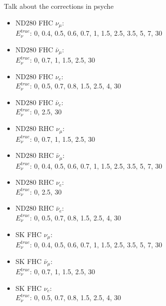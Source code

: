 Talk about the corrections in psyche
\begin{itemize}
  \item ND280 FHC $\nu_\mu$:\\
    $E_\nu^{true}$: 0, 0.4, 0.5, 0.6, 0.7, 1, 1.5, 2.5, 3.5, 5, 7, 30 \\

  \item ND280 FHC $\bar{\nu}_\mu$:\\
    $E_\nu^{true}$: 0, 0.7, 1, 1.5, 2.5, 30 \\

  \item ND280 FHC $\nu_e$:\\
    $E_\nu^{true}$: 0, 0.5, 0.7, 0.8, 1.5, 2.5, 4, 30 \\

  \item ND280 FHC $\bar{\nu}_e$:\\
    $E_\nu^{true}$: 0, 2.5, 30 \\

  \item ND280 RHC $\nu_\mu$:\\
    $E_\nu^{true}$: 0, 0.7, 1, 1.5, 2.5, 30 \\

  \item ND280 RHC $\bar{\nu}_\mu$:\\
    $E_\nu^{true}$: 0, 0.4, 0.5, 0.6, 0.7, 1, 1.5, 2.5, 3.5, 5, 7, 30 \\

  \item ND280 RHC $\nu_e$:\\
    $E_\nu^{true}$: 0, 2.5, 30 \\

  \item ND280 RHC $\bar{\nu}_e$:\\
    $E_\nu^{true}$: 0, 0.5, 0.7, 0.8, 1.5, 2.5, 4, 30 \\

  \item SK FHC $\nu_\mu$:\\
    $E_\nu^{true}$: 0, 0.4, 0.5, 0.6, 0.7, 1, 1.5, 2.5, 3.5, 5, 7, 30 \\

  \item SK FHC $\bar{\nu}_\mu$:\\
    $E_\nu^{true}$: 0, 0.7, 1, 1.5, 2.5, 30 \\

  \item SK FHC $\nu_e$:\\
    $E_\nu^{true}$: 0, 0.5, 0.7, 0.8, 1.5, 2.5, 4, 30 \\


\end{itemize}
